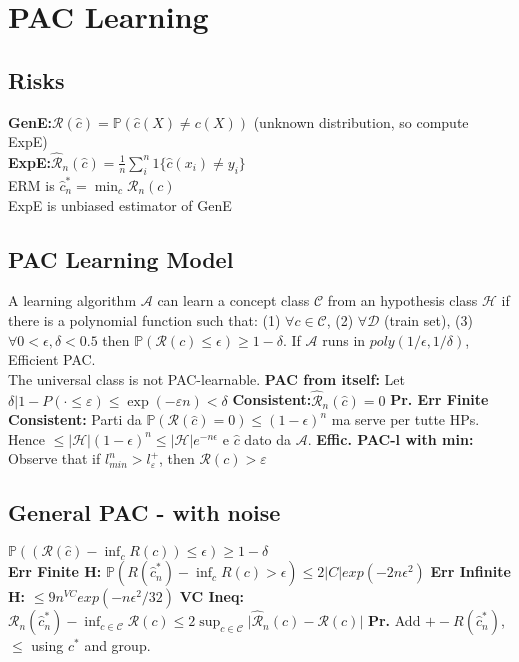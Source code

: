 \section*{PAC Learning}
\subsection*{Risks}
\textbf{GenE:}$\mathcal{R}(\hat c)=\mathbb{P}(\hat{c}(X)\ne c(X))$ (unknown distribution, so compute ExpE)\\
\textbf{ExpE:}$\mathcal{\hat R}_n(\hat c)=\frac{1}{n}\sum^n_i1\{\hat c(x_i)\ne y_i\}$\\
ERM is $\hat c_{n}^*=\min_c \hat{\mathcal R_n}(c)$\\
ExpE is unbiased estimator of GenE
\subsection*{PAC Learning Model}
A learning algorithm $\mathcal A$ can learn a concept class $\mathcal C$ from an hypothesis class $\mathcal H$ if there is a polynomial function such that: (1) $\forall c\in\mathcal C$, (2) $\forall\mathcal D$ (train set), (3) $\forall 0<\epsilon,\delta<0.5$ then $\mathbb{P}(\mathcal R(c)\le\epsilon)\ge 1-\delta$. If $\mathcal A$ runs in $poly(1/\epsilon,1/\delta)$, Efficient PAC.\\
The universal class is not PAC-learnable.
\textbf{PAC from itself:} Let $\delta |1-P(\cdot\leq\varepsilon)\leq \exp(-\varepsilon n)<\delta$
\textbf{Consistent:}$\mathcal{\hat R}_n(\hat c)=0$
\textbf{Pr. Err Finite Consistent:} Parti da $\mathbb{P}(\mathcal {R}(\hat c)=0)\le (1-\epsilon)^n$ ma serve per tutte HPs. Hence $\le |\mathcal H|(1-\epsilon)^n\le|\mathcal H|e^{-n\epsilon}$ e $\hat c$ dato da $\mathcal A$. \textbf{Effic. PAC-l with min:} Observe that if $l_{min}^n>l^+_\varepsilon$, then $\mathcal{R}(c)>\varepsilon$
\subsection*{General PAC - with noise}
$\mathbb{P}((\mathcal R(\hat c)-\inf_c R(c))\le\epsilon)\ge 1-\delta$\\
\textbf{Err Finite H:} $\mathbb{P}(R(\hat c_n^*)-\inf_cR(c)>\epsilon)\le 2|C|exp(-2n\epsilon^2)$
\textbf{Err Infinite H:} $\le 9n^{VC}exp(-n\epsilon^2/32)$
\textbf{VC Ineq:} $\mathcal{R}_n(\hat{c}_n^*)-\inf_{c\in\mathcal{C}}\mathcal{R}(c) \leq 2\sup_{c\in\mathcal{C}}\lvert \hat{\mathcal{R}}_n(c) - \mathcal{R}(c) \rvert$ \textbf{Pr.} Add $\mathcal +-R(\hat c_n^*)$, $\le$ using $c^*$ and group.
